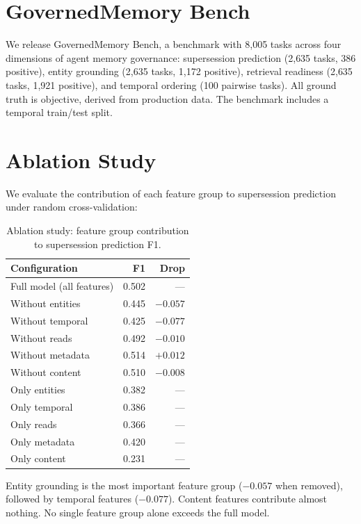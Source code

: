 \documentclass[sigconf,nonacm]{acmart}
\begin{document}
\section{GovernedMemory Bench}
\label{sec:bench}

We release GovernedMemory Bench, a benchmark with 8{,}005 tasks across four dimensions of agent memory governance: supersession prediction (2{,}635 tasks, 386 positive), entity grounding (2{,}635 tasks, 1{,}172 positive), retrieval readiness (2{,}635 tasks, 1{,}921 positive), and temporal ordering (100 pairwise tasks). All ground truth is objective, derived from production data. The benchmark includes a temporal train/test split.

\section{Ablation Study}
\label{sec:ablation}

We evaluate the contribution of each feature group to supersession prediction under random cross-validation:

\begin{table}[h]
\centering
\caption{Ablation study: feature group contribution to supersession prediction F1.}
\begin{tabular}{lrr}
\toprule
Configuration & F1 & Drop \\
\midrule
Full model (all features) & 0.502 & --- \\
Without entities & 0.445 & $-0.057$ \\
Without temporal & 0.425 & $-0.077$ \\
Without reads & 0.492 & $-0.010$ \\
Without metadata & 0.514 & $+0.012$ \\
Without content & 0.510 & $-0.008$ \\
\midrule
Only entities & 0.382 & --- \\
Only temporal & 0.386 & --- \\
Only reads & 0.366 & --- \\
Only metadata & 0.420 & --- \\
Only content & 0.231 & --- \\
\bottomrule
\end{tabular}
\end{table}

Entity grounding is the most important feature group ($-0.057$ when removed), followed by temporal features ($-0.077$). Content features contribute almost nothing. No single feature group alone exceeds the full model.
\end{document}
